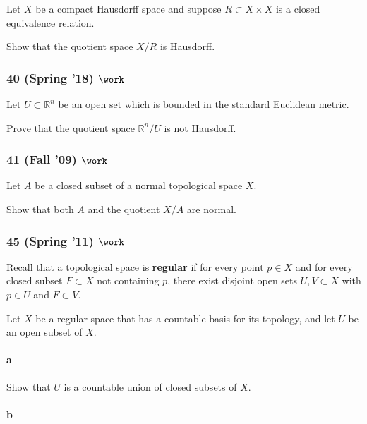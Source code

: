 Let \(X\) be a compact Hausdorff space and suppose
\(R \subset X \times X\) is a closed equivalence relation.

Show that the quotient space \(X/R\) is Hausdorff.

\hypertarget{spring-18-work}{%
\subsubsection{\texorpdfstring{40 (Spring '18)
\(\work\)}{40 (Spring '18) \textbackslash work}}\label{spring-18-work}}

Let \(U \subset {\mathbb{R}}^n\) be an open set which is bounded in the
standard Euclidean metric.

Prove that the quotient space \({\mathbb{R}}^n / U\) is not Hausdorff.

\hypertarget{fall-09-work}{%
\subsubsection{\texorpdfstring{41 (Fall '09)
\(\work\)}{41 (Fall '09) \textbackslash work}}\label{fall-09-work}}

Let \(A\) be a closed subset of a normal topological space \(X\).

Show that both \(A\) and the quotient \(X/A\) are normal.

\hypertarget{spring-11-work-1}{%
\subsubsection{\texorpdfstring{45 (Spring '11)
\(\work\)}{45 (Spring '11) \textbackslash work}}\label{spring-11-work-1}}

Recall that a topological space is \textbf{regular} if for every point
\(p \in X\) and for every closed subset \(F \subset X\) not containing
\(p\), there exist disjoint open sets \(U, V \subset X\) with
\(p \in U\) and \(F \subset V\).

Let \(X\) be a regular space that has a countable basis for its
topology, and let \(U\) be an open subset of \(X\).

\hypertarget{a-11}{%
\paragraph{a}\label{a-11}}

Show that \(U\) is a countable union of closed subsets of \(X\).

\hypertarget{b-11}{%
\paragraph{b}\label{b-11}}

